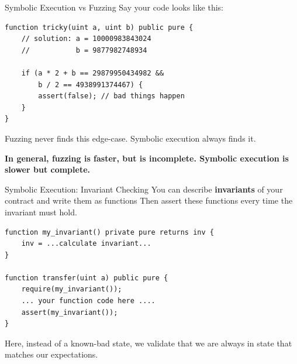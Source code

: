 \documentclass[aspectratio=169]{beamer}
\begin{document}
%
%
%

\begin{frame}[fragile=singleslide]{Symbolic Execution vs Fuzzing}
Say your code looks like this:

\begin{Verbatim}[frame=single, framerule=0.2mm, framesep=2mm,fontsize=\small]
function tricky(uint a, uint b) public pure {
	// solution: a = 10000983843024
	//           b = 9877982748934
	
	if (a * 2 + b == 29879950434982 &&
	    b / 2 == 4938991374467) {
		assert(false); // bad things happen
	}
}
\end{Verbatim}

Fuzzing never finds this edge-case. Symbolic execution always finds it.
\bigskip 

\textbf{In general, fuzzing is faster, but is incomplete. Symbolic execution is slower but complete.}

\end{frame}

\begin{frame}[fragile=singleslide]{Symbolic Execution: Invariant Checking}
You can describe \textbf{invariants} of your contract and write them as functions Then assert these functions every time the invariant must hold.
\begin{Verbatim}[frame=single, framerule=0.2mm, framesep=2mm,fontsize=\small]
function my_invariant() private pure returns inv {
	inv = ...calculate invariant...
}
	
function transfer(uint a) public pure {
	require(my_invariant());
	... your function code here ....
	assert(my_invariant());
}
\end{Verbatim}

Here, instead of a known-bad state, we validate that we are always in state that matches our expectations.
\end{frame}	
\end{document}
